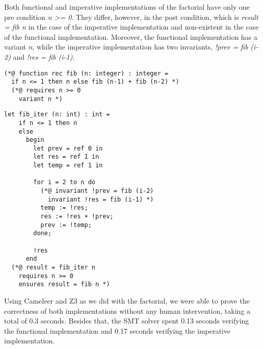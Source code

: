 Both functional and imperative implementations of the factorial have only one pre condition \emph{n >= 0}.
They differ, however, in the post condition, which is \emph{result = fib n} in the case of the imperative implementation and non-existent in the case of the functional implementation.
Moreover, the functional implementation has a variant \emph{n}, while the imperative implementation has two invariants, \emph{!prev = fib (i-2)} and \emph{!res = fib (i-1)}. 

\begin{lstlisting}[language=caml, caption={Functional fibonacci implementation},captionpos=b]
  (*@ function rec fib (n: integer) : integer =
  if n <= 1 then n else fib (n-1) + fib (n-2) *)
  (*@ requires n >= 0 
    variant n *)
\end{lstlisting}


\begin{lstlisting}[language=caml, caption={Imperative fibonacci implementation},captionpos=b]
  let fib_iter (n: int) : int =
    if n <= 1 then n
    else
      begin
        let prev = ref 0 in 
        let res = ref 1 in
        let temp = ref 1 in

        for i = 2 to n do
          (*@ invariant !prev = fib (i-2)
            invariant !res = fib (i-1) *)
          temp := !res;
          res := !res + !prev;
          prev := !temp;
        done;

        !res
      end
  (*@ result = fib_iter n
    requires n >= 0 
    ensures result = fib n *)
\end{lstlisting}

Using Cameleer and Z3 as we did with the factorial, we were able to prove the correctness of both implementations without any human intervention, taking a total of 0.3 seconds.
Besides that, the SMT solver spent 0.13 seconds verifying the functional implementation and 0.17 seconds verifying the imperative implementation.

